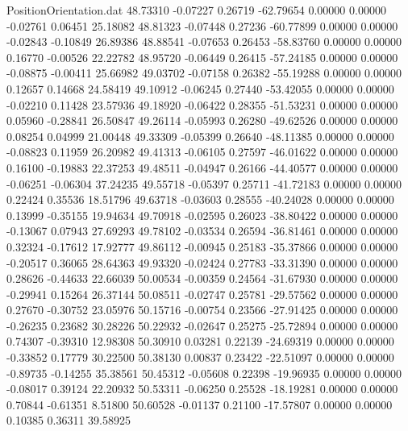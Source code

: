 \begin{filecontents}{PositionOrientation.dat}
  48.73310   -0.07227    0.26719   -62.79654    0.00000    0.00000   -0.02761    0.06451   25.18082
  48.81323   -0.07448    0.27236   -60.77899    0.00000    0.00000   -0.02843   -0.10849   26.89386
  48.88541   -0.07653    0.26453   -58.83760    0.00000    0.00000    0.16770   -0.00526   22.22782
  48.95720   -0.06449    0.26415   -57.24185    0.00000    0.00000   -0.08875   -0.00411   25.66982
  49.03702   -0.07158    0.26382   -55.19288    0.00000    0.00000    0.12657    0.14668   24.58419
  49.10912   -0.06245    0.27440   -53.42055    0.00000    0.00000   -0.02210    0.11428   23.57936
  49.18920   -0.06422    0.28355   -51.53231    0.00000    0.00000    0.05960   -0.28841   26.50847
  49.26114   -0.05993    0.26280   -49.62526    0.00000    0.00000    0.08254    0.04999   21.00448
  49.33309   -0.05399    0.26640   -48.11385    0.00000    0.00000   -0.08823    0.11959   26.20982
  49.41313   -0.06105    0.27597   -46.01622    0.00000    0.00000    0.16100   -0.19883   22.37253
  49.48511   -0.04947    0.26166   -44.40577    0.00000    0.00000   -0.06251   -0.06304   37.24235
  49.55718   -0.05397    0.25711   -41.72183    0.00000    0.00000    0.22424    0.35536   18.51796
  49.63718   -0.03603    0.28555   -40.24028    0.00000    0.00000    0.13999   -0.35155   19.94634
  49.70918   -0.02595    0.26023   -38.80422    0.00000    0.00000   -0.13067    0.07943   27.69293
  49.78102   -0.03534    0.26594   -36.81461    0.00000    0.00000    0.32324   -0.17612   17.92777
  49.86112   -0.00945    0.25183   -35.37866    0.00000    0.00000   -0.20517    0.36065   28.64363
  49.93320   -0.02424    0.27783   -33.31390    0.00000    0.00000    0.28626   -0.44633   22.66039
  50.00534   -0.00359    0.24564   -31.67930    0.00000    0.00000   -0.29941    0.15264   26.37144
  50.08511   -0.02747    0.25781   -29.57562    0.00000    0.00000    0.27670   -0.30752   23.05976
  50.15716   -0.00754    0.23566   -27.91425    0.00000    0.00000   -0.26235    0.23682   30.28226
  50.22932   -0.02647    0.25275   -25.72894    0.00000    0.00000    0.74307   -0.39310   12.98308
  50.30910    0.03281    0.22139   -24.69319    0.00000    0.00000   -0.33852    0.17779   30.22500
  50.38130    0.00837    0.23422   -22.51097    0.00000    0.00000   -0.89735   -0.14255   35.38561
  50.45312   -0.05608    0.22398   -19.96935    0.00000    0.00000   -0.08017    0.39124   22.20932
  50.53311   -0.06250    0.25528   -18.19281    0.00000    0.00000    0.70844   -0.61351    8.51800
  50.60528   -0.01137    0.21100   -17.57807    0.00000    0.00000    0.10385    0.36311   39.58925

\end{filecontents}
